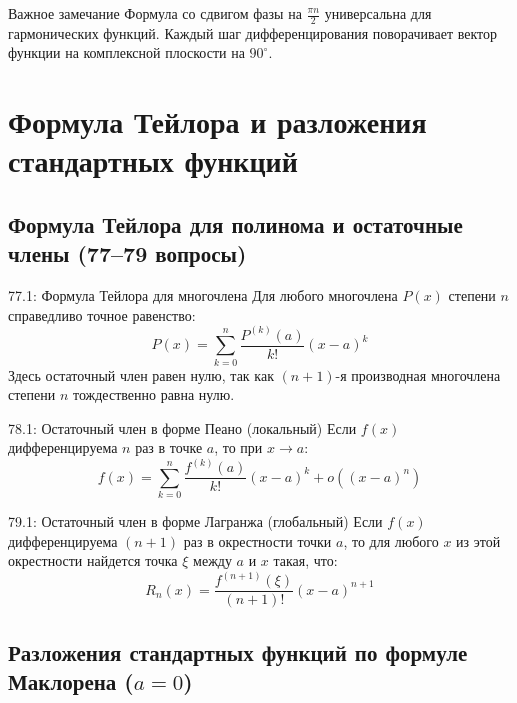 \documentclass[a4paper,12pt]{article}
\begin{document}
	\begin{notebook}{Важное замечание}
		Формула со сдвигом фазы на $\frac{\pi n}{2}$ универсальна для гармонических функций. Каждый шаг дифференцирования поворачивает вектор функции на комплексной плоскости на $90^\circ$.
	\end{notebook}
	
	
	
	
	
	
	
	
	\newpage
	\section{Формула Тейлора и разложения стандартных функций}
	
	\subsection{Формула Тейлора для полинома и остаточные члены (77--79 вопросы)}
	
	\begin{theorembox}{77.1: Формула Тейлора для многочлена}
		Для любого многочлена $P(x)$ степени $n$ справедливо точное равенство:
		$$ P(x) = \sum_{k=0}^{n} \frac{P^{(k)}(a)}{k!} (x-a)^k $$
		Здесь остаточный член равен нулю, так как $(n+1)$-я производная многочлена степени $n$ тождественно равна нулю.
	\end{theorembox}
	
	\begin{theorembox}{78.1: Остаточный член в форме Пеано (локальный)}
		Если $f(x)$ дифференцируема $n$ раз в точке $a$, то при $x \to a$:
		$$ f(x) = \sum_{k=0}^{n} \frac{f^{(k)}(a)}{k!} (x-a)^k + o((x-a)^n) $$
	\end{theorembox}
	
	\begin{theorembox}{79.1: Остаточный член в форме Лагранжа (глобальный)}
		Если $f(x)$ дифференцируема $(n+1)$ раз в окрестности точки $a$, то для любого $x$ из этой окрестности найдется точка $\xi$ между $a$ и $x$ такая, что:
		$$ R_n(x) = \frac{f^{(n+1)}(\xi)}{(n+1)!} (x-a)^{n+1} $$
	\end{theorembox}
	
	
	\newpage
	\subsection{Разложения стандартных функций по формуле Маклорена ($a=0$)}
	
\end{document}
